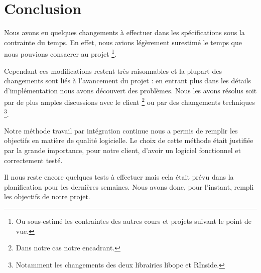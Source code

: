\documentclass[a4paper,titlepage,french]{report}
\begin{document}
\chapter*{Conclusion}

Nous avons eu quelques changements à effectuer dans les spécifications sous la contrainte du temps.
En effet, nous avions légèrement surestimé le temps que nous pouvions consacrer au projet \footnote{Ou sous-estimé les contraintes des autres cours et projets suivant le point de vue.}.

Cependant ces modifications restent très raisonnables et la plupart des changements sont liés à l'avancement du projet : en entrant plus dans les détails d'implémentation nous avons découvert des problèmes. Nous les avons résolus soit par de plus amples discussions avec le client \footnote{Dans notre cas notre encadrant.} ou par des changements techniques \footnote{Notamment les changements des deux librairies libopc et RInside.}.

Notre méthode travail par intégration continue nous a permis de remplir les objectifs en matière de qualité logicielle.
Le choix de cette méthode était justifiée par la grande importance, pour notre client, d'avoir un logiciel fonctionnel et correctement testé.

Il nous reste encore quelques tests à effectuer mais cela était prévu dans la planification pour les dernières semaines.
Nous avons donc, pour l'instant, rempli les objectifs de notre projet.
\end{document}
